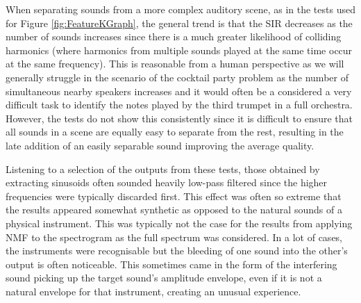 \documentclass[12pt,a4paper,twoside,openright]{report}
\begin{document}


{\color{red}When separating sounds from a more complex auditory scene, as in the tests used for Figure \ref{fig:FeatureKGraph}, the general trend is that the SIR decreases as the number of sounds increases since there is a much greater likelihood of colliding harmonics (where harmonics from multiple sounds played at the same time occur at the same frequency). This is reasonable from a human perspective as we will generally struggle in the scenario of the cocktail party problem as the number of simultaneous nearby speakers increases and it would often be a considered a very difficult task to identify the notes played by the third trumpet in a full orchestra. However, the tests do not show this consistently since it is difficult to ensure that all sounds in a scene are equally easy to separate from the rest, resulting in the late addition of an easily separable sound improving the average quality.

Listening to a selection of the outputs from these tests, those obtained by extracting sinusoids often sounded heavily low-pass filtered since the higher frequencies were typically discarded first. This effect was often so extreme that the results appeared somewhat synthetic as opposed to the natural sounds of a physical instrument. This was typically not the case for the results from applying NMF to the spectrogram as the full spectrum was considered. In a lot of cases, the instruments were recognisable but the bleeding of one sound into the other's output is often noticeable. This sometimes came in the form of the interfering sound picking up the target sound's amplitude envelope, even if it is not a natural envelope for that instrument, creating an unusual experience.}
\end{document}
